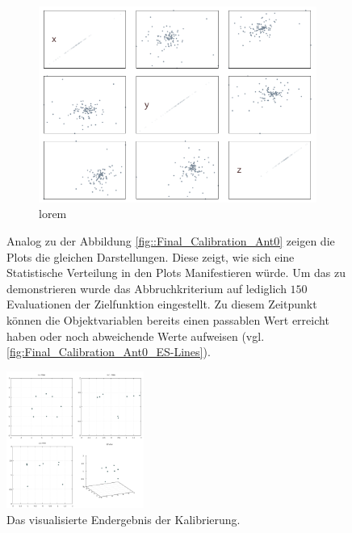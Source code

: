 \begin{figure}[h]
\begin{subfigure}[h]{0.4\textwidth}
                 \label{fig:abortedFinal_Calibration_Ant0_ES-Lines}
         \end{subfigure}
%
\\
%
         \begin{subfigure}[h]{0.4\textwidth}
                 \centering
                 \includegraphics[width=\textwidth]{img/calibration/aborted_calibration_ant0-scatter.png}
                 \caption{lorem}
                 \label{fig:abortedFinal_Calibration_Ant0_ES-Scatter}
         \end{subfigure}
%
         \caption{Analog zu der Abbildung \ref{fig::Final_Calibration_Ant0} zeigen die Plots die gleichen Darstellungen. Diese zeigt, wie sich eine Statistische Verteilung in den Plots Manifestieren würde. Um das zu demonstrieren wurde das Abbruchkriterium auf lediglich $150$ Evaluationen der Zielfunktion eingestellt. Zu diesem Zeitpunkt können die Objektvariablen bereits einen passablen Wert erreicht haben oder noch abweichende Werte aufweisen (vgl. \ref{fig:Final_Calibration_Ant0_ES-Lines}).}
         \label{fig::abortedFinal_Calibration_Ant0_ES}
\end{figure}
%
\begin{figure}[h]
         \centering
         \includegraphics[width=0.4\textwidth]{img/calibration/calibration_results.png}
         \caption{Das visualisierte Endergebnis der Kalibrierung.}
         \label{fig:3dplot_coordinates}
%
\end{figure}

